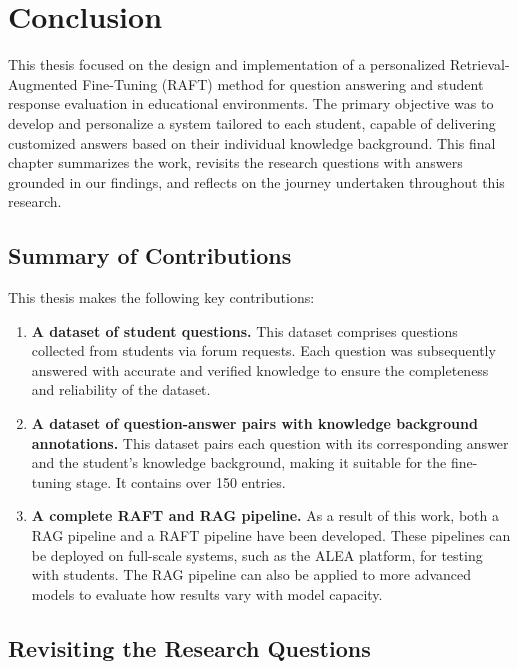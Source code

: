 \chapter{Conclusion}
\label{chap:conclusion}

This thesis focused on the design and implementation of a personalized Retrieval-Augmented Fine-Tuning (RAFT) method for question answering and student response evaluation in educational environments. The primary objective was to develop and personalize a system tailored to each student, capable of delivering customized answers based on their individual knowledge background. This final chapter summarizes the work, revisits the research questions with answers grounded in our findings, and reflects on the journey undertaken throughout this research.

\section{Summary of Contributions}

This thesis makes the following key contributions:

\begin{enumerate}
    \item \textbf{A dataset of student questions.} This dataset comprises questions collected from students via forum requests. Each question was subsequently answered with accurate and verified knowledge to ensure the completeness and reliability of the dataset.

    \item \textbf{A dataset of question-answer pairs with knowledge background annotations.} This dataset pairs each question with its corresponding answer and the student's knowledge background, making it suitable for the fine-tuning stage. It contains over 150 entries.

    \item \textbf{A complete RAFT and RAG pipeline.} As a result of this work, both a  RAG pipeline and a RAFT pipeline have been developed. These pipelines can be deployed on full-scale systems, such as the ALEA platform, for testing with students. The RAG pipeline can also be applied to more advanced models to evaluate how results vary with model capacity.
\end{enumerate}

\section{Revisiting the Research Questions}

